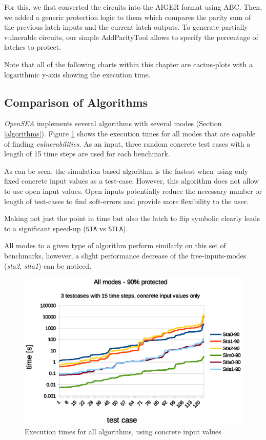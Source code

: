 \documentclass[a4paper,10pt]{article}
\begin{document}
For this, we first converted the circuits into the AIGER format using ABC. Then, we added a generic protection logic to them which compares the parity sum
of the previous latch inputs and the current latch outputs. To generate partially vulnerable circuits, our simple AddParityTool allows to specify the percentage of latches to protect.

Note that all of the following charts within this chapter are cactus-plots with a logarithmic y-axis showing the execution time.


\subsection{Comparison of Algorithms}
\emph{OpenSEA} implements several algorithms with several modes (Section \ref{algorithms}). Figure \ref{all_modes} shows the execution times for all modes that are capable of finding \emph{vulnerabilities}.
As an input, three random concrete test cases with a length of 15 time steps are used for each benchmark.

As can be seen, the simulation based algorithm is the fastest when using only fixed concrete input values as a test-case. However, this algorithm does not allow to use open input values.
Open inputs potentially reduce the necessary number or length of test-cases to find soft-errors and provide more flexibility to the user.

Making not just the point in time but also the latch to flip symbolic clearly leads to a significant speed-up (\texttt{STA} vs \texttt{STLA}).

All modes to a given type of algorithm perform similarly on this set of benchmarks, however, a slight performance decrease of the free-inputs-modes (\emph{sta2}, \emph{stla1}) can be noticed.


\begin{figure}[!htb]
\centering
\includegraphics[scale = 0.5]{img/all_modes.eps}
\centering \caption{Execution times for all algorithms, using concrete input values}
\label{all_modes}
\end{figure}
\end{document}
